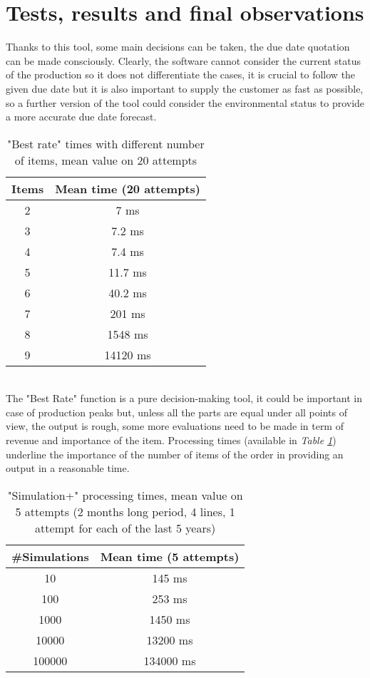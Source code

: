 \documentclass[a4paper,12pt]{article}
\begin{document}
\section{Tests, results and final observations}
Thanks to this tool, some main decisions can be taken, the due date quotation can be made consciously. Clearly, the software cannot consider the current status of the production so it does not differentiate the cases, it is crucial to follow the given due date but it is also important to supply the customer as fast as possible, so a further version of the tool could consider the environmental status to provide a more accurate due date forecast. \\
\begin{table}[htb]
\centering
\begin{tabular}{|c|c|}
\hline
Items & Mean time (20 attempts) \\ \hline
2 & 7 ms \\ \hline
3 & 7.2 ms \\ \hline
4 & 7.4 ms \\ \hline
5 & 11.7 ms \\ \hline
6 & 40.2 ms \\ \hline
7 & 201 ms \\ \hline
8 & 1548 ms \\ \hline
9 & 14120 ms \\ \hline
\end{tabular}
\caption{"Best rate" times with different number of items, mean value on 20 attempts}
\label{tab:best-rate}
\end{table}\\
The "Best Rate" function is a pure decision-making tool, it could be important in case of production peaks but, unless all the parts are equal under all points of view, the output is rough, some more evaluations need to be made in term of revenue and importance of the item. Processing times (available in \textit{Table \ref{tab:best-rate}}) underline the importance of the number of items of the order in providing an output in a reasonable time. \\
\begin{table}[htb]
\centering
\begin{tabular}{|c|c|}
\hline
\#Simulations & Mean time (5 attempts) \\ \hline
10 & 145 ms \\ \hline
100 & 253 ms \\ \hline
1000 & 1450 ms \\ \hline
10000 & 13200 ms \\ \hline
100000 & 134000 ms \\ \hline
\end{tabular}
\caption{"Simulation+" processing times, mean value on 5 attempts (2 months long period, 4 lines, 1 attempt for each of the last 5 years)}
\label{tab:simulation-plus}
\end{table}\\
\end{document}
